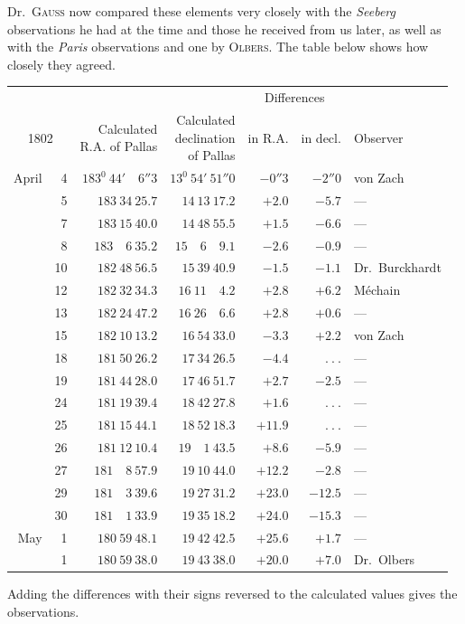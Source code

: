 Dr.\ \textsc{Gauss} now compared these elements very closely with the \textit{Seeberg} observations he had at the time and those he received from us later, as well as with the \textit{Paris} observations and one by \textsc{Olbers}. The table below shows how closely they agreed.
\begin{center}
{\small\setlength{\tabcolsep}{3pt}
\begin{tabular}{r r|r|r|r|r|l}
\multicolumn{2}{c|}{}&&&\multicolumn{2}{c|}{Differences}&\\
\multicolumn{2}{c|}{1802}&\shortstack{Calculated\\R.A. of Pallas}&\shortstack{Calculated\\declination\\of Pallas}&in R.A.&in decl.&Observer\\\hline
April&4&$183^0\ 44'\quad6''3$&$13^0\ 54'\ 51''0$&$-0''3$&$-2''0$&von Zach\\
&5&$183\ 34\ 25.7$&$14\ 13\ 17.2$&$+2.0$&$-5.7$&—\\
&7&$183\ 15\ 40.0$&$14\ 48\ 55.5$&$+1.5$&$-6.6$&—\\
&8&$183\quad6\ 35.2$&$15\quad6\quad9.1$&$-2.6$&$-0.9$&—\\
&10&$182\ 48\ 56.5$&$15\ 39\ 40.9$&$-1.5$&$-1.1$&Dr.\ Burckhardt\\
&12&$182\ 32\ 34.3$&$16\ 11\quad4.2$&$+2.8$&$+6.2$&Méchain\\
&13&$182\ 24\ 47.2$&$16\ 26\quad6.6$&$+2.8$&$+0.6$&—\\
&15&$182\ 10\ 13.2$&$16\ 54\ 33.0$&$-3.3$&$+2.2$&von Zach\\
&18&$181\ 50\ 26.2$&$17\ 34\ 26.5$&$-4.4$&$\ .\ .\ .$&—\\
&19&$181\ 44\ 28.0$&$17\ 46\ 51.7$&$+2.7$&$-2.5$&—\\
&24&$181\ 19\ 39.4$&$18\ 42\ 27.8$&$+1.6$&$\ .\ .\ .$&—\\
&25&$181\ 15\ 44.1$&$18\ 52\ 18.3$&$+11.9$&$\ .\ .\ .$&—\\
&26&$181\ 12\ 10.4$&$19\quad1\ 43.5$&$+8.6$&$-5.9$&—\\
&27&$181\quad8\ 57.9$&$19\ 10\ 44.0$&$+12.2$&$-2.8$&—\\
&29&$181\quad3\ 39.6$&$19\ 27\ 31.2$&$+23.0$&$-12.5$&—\\
&30&$181\quad1\ 33.9$&$19\ 35\ 18.2$&$+24.0$&$-15.3$&—\\
May&1&$180\ 59\ 48.1$&$19\ 42\ 42.5$&$+25.6$&$+1.7$&—\\
&1&$180\ 59\ 38.0$&$19\ 43\ 38.0$&$+20.0$&$+7.0$&Dr.\ Olbers
\end{tabular}}
\end{center}
Adding the differences with their signs reversed to the calculated values gives the observations.

